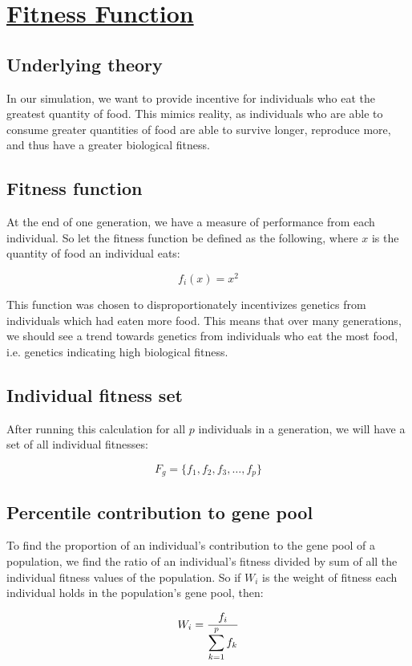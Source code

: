 \newpage
\section{\underline{Fitness Function}}

\subsection{Underlying theory}
In our simulation, we want to provide incentive for individuals who eat the greatest quantity of food. This mimics reality, as individuals who are able to consume greater quantities of food are able to survive longer, reproduce more, and thus have a greater biological fitness.

\subsection{Fitness function}
\nid At the end of one generation, we have a measure of performance from each individual. So let the fitness function be defined as the following, where $x$ is the quantity of food an individual eats:

$$f_i(x)=x^2$$

\ms
\nid This function was chosen to disproportionately incentivizes genetics from individuals which had eaten more food. This means that over many generations, we should see a trend towards genetics from individuals who eat the most food, i.e. genetics indicating high biological fitness. 

\subsection{Individual fitness set}
\nid After running this calculation for all $p$ individuals in a generation, we will have a set of all individual fitnesses:

$$
F_g=\{f_1, f_2, f_3, \ldots, f_{p}\}
$$

\subsection{Percentile contribution to gene pool}
\nid To find the proportion of an individual's contribution to the gene pool of a population, we find the ratio of an individual's fitness divided by sum of all the individual fitness values of the population. So if $W_i$ is the weight of fitness each individual holds in the population's gene pool, then:

$$
W_i=\frac{f_i}{\mathlarger{\sum_{k=1}^{p} f_k}}
$$

